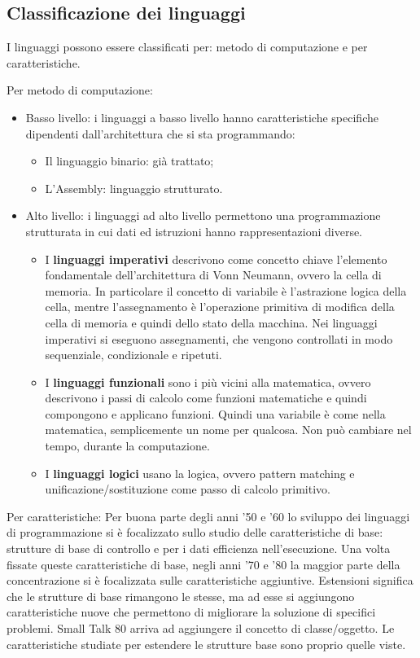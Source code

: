 \documentclass[oneside,a4paper,11pt]{book}
\theoremstyle{italicstyle}
\theoremstyle{normStyle}
\begin{document}
\subsection{Classificazione dei linguaggi}
I linguaggi possono essere classificati per: metodo di computazione e per
caratteristiche.

Per metodo di computazione:
\begin{itemize}
  \item Basso livello: i linguaggi a basso livello hanno caratteristiche 
  specifiche dipendenti dall'architettura che si sta programmando:
  \begin{itemize}
    \item Il linguaggio binario: già trattato;
    \item L'Assembly: linguaggio strutturato.
  \end{itemize}
  \item Alto livello: i linguaggi ad alto livello permettono una 
  programmazione strutturata in cui dati ed istruzioni hanno rappresentazioni 
  diverse.
  \begin{itemize}
    \item I \textbf{linguaggi imperativi} descrivono come concetto chiave l'elemento fondamentale 
    dell'architettura di Vonn Neumann, ovvero la cella di memoria. In particolare 
    il concetto di variabile è l'astrazione logica della cella, mentre 
    l'assegnamento è l'operazione primitiva di modifica della cella di 
    memoria e quindi dello stato della macchina. Nei linguaggi imperativi 
    si eseguono assegnamenti, che vengono controllati in modo sequenziale, 
    condizionale e ripetuti.
    \item I \textbf{linguaggi funzionali} sono i più vicini alla matematica, 
    ovvero descrivono i passi di calcolo come funzioni matematiche e quindi 
    compongono e applicano funzioni. Quindi una variabile è come nella matematica, 
    semplicemente un nome per qualcosa. Non può cambiare nel tempo, durante la computazione.
    \item I \textbf{linguaggi logici} usano la logica, ovvero pattern matching e unificazione/sostituzione 
    come passo di calcolo primitivo.
  \end{itemize}
\end{itemize}

Per caratteristiche: Per buona parte degli anni '50 e '60 lo sviluppo 
dei linguaggi di programmazione si è focalizzato sullo studio delle 
caratteristiche di base: strutture di base di controllo e per i dati
efficienza nell'esecuzione. Una volta fissate queste caratteristiche 
di base, negli anni '70 e '80 la maggior parte della concentrazione si è 
focalizzata sulle caratteristiche aggiuntive. Estensioni significa 
che le strutture di base rimangono le stesse, ma ad esse si aggiungono 
caratteristiche nuove che permettono di migliorare la soluzione di specifici 
problemi. Small Talk 80 arriva ad aggiungere il concetto di classe/oggetto. Le 
caratteristiche studiate per estendere le strutture base sono proprio 
quelle viste.
\end{document}
